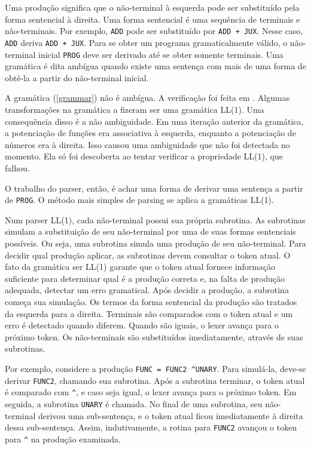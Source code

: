 Uma produção significa que o não-terminal à esquerda pode ser substituído
pela forma sentencial à direita.
Uma forma sentencial é uma sequência de terminais e não-terminais.
Por exemplo, \texttt{ADD} pode ser substituído por \texttt{ADD + JUX}.
Nesse caso, \texttt{ADD} deriva \texttt{ADD + JUX}.
Para se obter um programa gramaticalmente válido,
o não-terminal inicial \texttt{PROG} deve ser derivado até se obter somente terminais.
Uma gramática é dita ambígua quando existe uma sentença com mais de uma forma de
obtê-la a partir do não-terminal inicial.

A gramática (\ref{grammar}) não é ambígua.
A verificação foi feita em \cite{GramCheck}.
Algumas transformações na gramática a fizeram ser uma gramática LL(1).
Uma consequência disso é a não ambiguidade.
Em uma iteração anterior da gramática, a potenciação de funções
era associativa à esquerda,
enquanto a potenciação de números era à direita.
Isso causou uma ambiguidade que não foi detectada no momento.
Ela só foi descoberta ao tentar verificar a propriedade LL(1), que falhou.

O trabalho do parser, então, é achar uma forma de derivar uma
sentença a partir de \texttt{PROG}.
O método mais simples de parsing se aplica a gramáticas LL(1).

Num parser LL(1), cada não-terminal possui sua própria subrotina.
As subrotinas simulam a substituição de seu não-terminal
por uma de suas formas sentenciais possíveis.
Ou seja, uma subrotina simula uma produção de seu não-terminal.
Para decidir qual produção aplicar, as subrotinas devem consultar o token atual.
O fato da gramática ser LL(1) garante que o token atual fornece
informação suficiente para determinar qual é a produção correta e,
na falta de produção adequada,
detectar um erro gramatical. Após decidir a produção,
a subrotina começa sua simulação.
Os termos da forma sentencial da produção são tratados da esquerda para a direita.
Terminais são comparados com o token atual e um erro é detectado quando diferem.
Quando são iguais, o lexer avança para o próximo token.
Os não-terminais são substituídos imediatamente, através de suas subrotinas.

Por exemplo, considere a produção \texttt{FUNC = FUNC2 \textasciicircum UNARY}.
Para simulá-la, deve-se derivar \texttt{FUNC2}, chamando sua subrotina.
Após a subrotina terminar, o token atual é comparado com \texttt{\textasciicircum},
e caso seja igual, o lexer avança para o próximo token.
Em seguida, a subrotina \texttt{UNARY} é chamada.
No final de uma subrotina, seu não-terminal derivou uma sub-sentença,
e o token atual ficou imediatamente à direita dessa sub-sentença.
Assim, indutivamente, a rotina para \texttt{FUNC2} avançou
o token para \texttt{\textasciicircum} na produção examinada.

